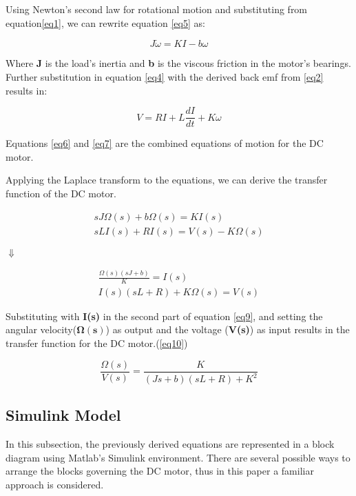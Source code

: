 Using Newton's second law for rotational motion and substituting from equation\ref{eq1}, we can rewrite equation \ref{eq5} as:

\begin{equation} \label{eq6}
J\dot{\omega} = KI - b\omega
\end{equation}

Where \textbf{J} is the load's inertia and \textbf{b} is the viscous friction in the motor's bearings.
Further substitution in equation \ref{eq4} with the derived back emf from \ref{eq2} results in:

\begin{equation} \label{eq7}
V = RI + L\frac{dI}{dt} + K\omega
\end{equation}

Equations \ref{eq6} and \ref{eq7} are the combined equations of motion for the DC motor.

Applying the Laplace transform to the equations, we can derive the transfer function of the DC motor.

\begin{align}  
sJ\Omega(s) + b\Omega(s) = KI(s) \label{eq8}\\
sLI(s) + RI(s) = V(s) - K\Omega(s) \nonumber
\end{align}

\begin{center}
$\Downarrow$
\end{center}

\begin{align} 
\frac{\Omega(s)(sJ + b)}{K} = I(s) \label{eq9} \\
I(s)(sL + R) + K\Omega(s) = V(s)  \nonumber 
\end{align}

Substituting with \textbf{I(s)} in the second part of equation \ref{eq9}, and setting the angular velocity($\boldsymbol{\Omega(s)}$) as output and the voltage (\textbf{V(s)}) as input results in the transfer function for the DC motor.(\ref{eq10})

\begin{equation} \label{eq10}
\frac{\Omega(s)}{V(s)} = \frac{K}{(Js + b)(sL + R) + K^2}
\end{equation}

\subsection{Simulink Model} \label{dc_model}

In this subsection, the previously derived equations are represented in a block diagram using Matlab's Simulink environment. There are several possible ways to arrange the blocks governing the DC motor, thus in this paper a familiar approach is considered.

